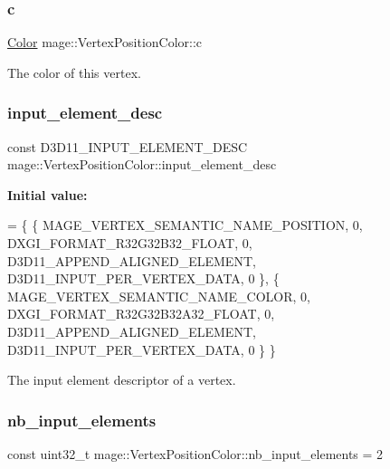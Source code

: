 \subsubsection{\texorpdfstring{c}{c}}
{\footnotesize\ttfamily \hyperlink{structmage_1_1_color}{Color} mage\+::\+Vertex\+Position\+Color\+::c}

The color of this vertex. \hypertarget{structmage_1_1_vertex_position_color_a29c05b95b7305ed7552ce22892d17371}{}\label{structmage_1_1_vertex_position_color_a29c05b95b7305ed7552ce22892d17371} 
\subsubsection{\texorpdfstring{input\+\_\+element\+\_\+desc}{input\_element\_desc}}
{\footnotesize\ttfamily const D3\+D11\+\_\+\+I\+N\+P\+U\+T\+\_\+\+E\+L\+E\+M\+E\+N\+T\+\_\+\+D\+E\+SC mage\+::\+Vertex\+Position\+Color\+::input\+\_\+element\+\_\+desc\hspace{0.3cm}{\ttfamily [static]}}

{\bfseries Initial value\+:}
\begin{DoxyCode}
= \{
        \{ MAGE\_VERTEX\_SEMANTIC\_NAME\_POSITION, 0, DXGI\_FORMAT\_R32G32B32\_FLOAT,    0, 
      D3D11\_APPEND\_ALIGNED\_ELEMENT, D3D11\_INPUT\_PER\_VERTEX\_DATA, 0 \},
        \{ MAGE\_VERTEX\_SEMANTIC\_NAME\_COLOR,    0, DXGI\_FORMAT\_R32G32B32A32\_FLOAT, 0, 
      D3D11\_APPEND\_ALIGNED\_ELEMENT, D3D11\_INPUT\_PER\_VERTEX\_DATA, 0 \}
    \}
\end{DoxyCode}
The input element descriptor of a vertex. \hypertarget{structmage_1_1_vertex_position_color_a5cf281fd9ddf28f5d1120bb540417ada}{}\label{structmage_1_1_vertex_position_color_a5cf281fd9ddf28f5d1120bb540417ada} 
\subsubsection{\texorpdfstring{nb\+\_\+input\+\_\+elements}{nb\_input\_elements}}
{\footnotesize\ttfamily const uint32\+\_\+t mage\+::\+Vertex\+Position\+Color\+::nb\+\_\+input\+\_\+elements = 2\hspace{0.3cm}{\ttfamily [static]}}


